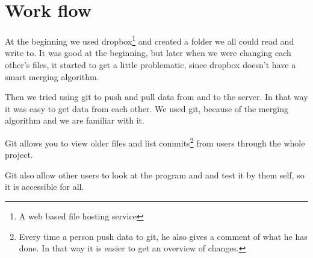 \chapter{Work flow}
At the beginning we used dropbox\footnote{A web based file hosting service} and created a folder we all could read and write to. It was good at the beginning, but later when we were changing each other's files, it started to get a little problematic, since dropbox doesn't have a smart merging algorithm.

Then we tried using git to push and pull data from and to the server. In that way it was easy to get data from each other. We used git, because of the merging algorithm and we are familiar with it.

Git allows you to view older files and list commits\footnote{Every time a person push data to git, he also gives a comment of what he has done. In that way it is easier to get an overview of changes.} from users through the whole project.

Git also allow other users to look at the program and and test it by them self, so it is accessible for all.